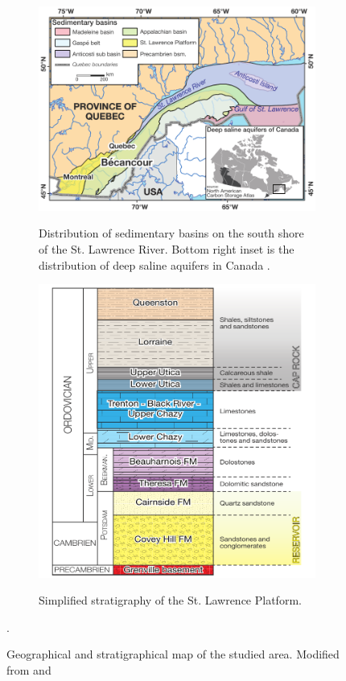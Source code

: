 \begin{figure}[!ht]
        \centering
        \begin{subfigure}[b]{.55\textwidth}
                \caption{Distribution of sedimentary basins on the south shore
of the St. Lawrence River. Bottom right inset is the distribution of deep saline
aquifers in Canada \citep{Wright2013}.}
                \includegraphics[width=\textwidth]{fig/map.pdf}
                \label{fig:map}
        \end{subfigure}%

        \begin{subfigure}[b]{.55\textwidth}
                \caption{Simplified stratigraphy of the St. Lawrence Platform.}
                \includegraphics[width=\textwidth]{fig/strati.pdf}
                \label{fig:strati}
        \end{subfigure}

        \caption{Geographical and stratigraphical map of the studied area.
Modified from \citep{Malo2012} and  \citep{Claprood2012}}
        \label{fig:geo}.
\end{figure}
